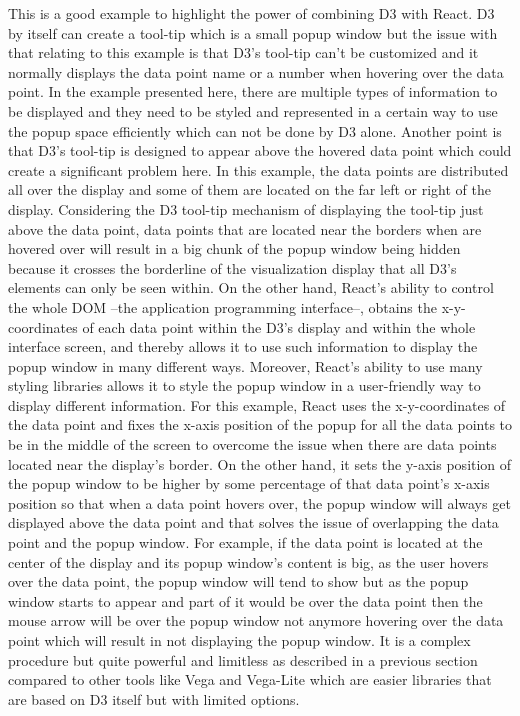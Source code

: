 This is a good example to highlight the power of combining D3 with React. D3 by itself can create a tool-tip which is a small popup window but the issue with that relating to this example is that D3's tool-tip can't be customized and it normally displays the data point name or a number when hovering over the data point. In the example presented here, there are multiple types of information to be displayed and they need to be styled and represented in a certain way to use the popup space efficiently which can not be done by D3 alone. Another point is that D3's tool-tip is designed to appear above the hovered data point which could create a significant problem here. In this example, the data points are distributed all over the display and some of them are located on the far left or right of the display. Considering the D3 tool-tip mechanism of displaying the tool-tip just above the data point, data points that are located near the borders when are hovered over will result in a big chunk of the popup window being hidden because it crosses the borderline of the visualization display that all D3's elements can only be seen within. On the other hand, React's ability to control the whole DOM --the application programming interface--, obtains the x-y-coordinates of each data point within the D3's display and within the whole interface screen, and thereby allows it to use such information to display the popup window in many different ways. Moreover, React's ability to use many styling libraries allows it to style the popup window in a user-friendly way to display different information. For this example, React uses the x-y-coordinates of the data point and fixes the x-axis position of the popup for all the data points to be in the middle of the screen to overcome the issue when there are data points located near the display's border. On the other hand, it sets the y-axis position of the popup window to be higher by some percentage of that data point's x-axis position so that when a data point hovers over, the popup window will always get displayed above the data point and that solves the issue of overlapping the data point and the popup window. For example, if the data point is located at the center of the display and its popup window's content is big, as the user hovers over the data point, the popup window will tend to show but as the popup window starts to appear and part of it would be over the data point then the mouse arrow will be over the popup window not anymore hovering over the data point which will result in not displaying the popup window. It is a complex procedure but quite powerful and limitless as described in a previous section compared to other tools like Vega and Vega-Lite which are easier libraries that are based on D3 itself but with limited options.

